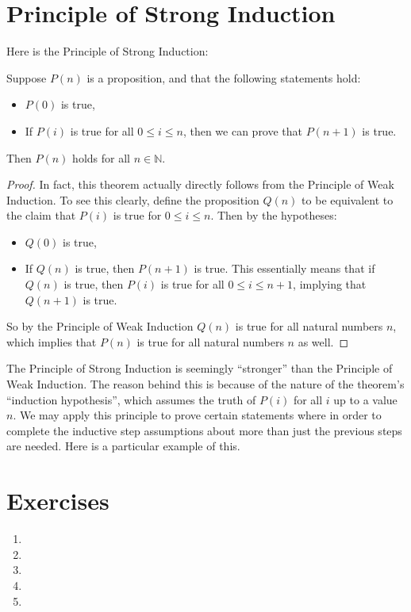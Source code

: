 \section{Principle of Strong Induction}

Here is the Principle of Strong Induction:

\begin{theorem}
Suppose $P(n)$ is a proposition, and that the following statements hold:
\begin{itemize}
    \item $P(0)$ is true,
    \item If $P(i)$ is true for all $0 \leq i \leq n$, then we can prove that $P(n + 1)$ is true.
\end{itemize}
Then $P(n)$ holds for all $n \in \mathbb{N}$.
\end{theorem}
\begin{proof}
In fact, this theorem actually directly follows from the Principle of Weak Induction. To see this clearly, define the proposition $Q(n)$ to be equivalent to the claim that $P(i)$ is true for $0 \leq i \leq n$. Then by the hypotheses:
\begin{itemize}
	\item $Q(0)$ is true,
	\item If $Q(n)$ is true, then $P(n + 1)$ is true. This essentially means that if $Q(n)$ is true, then $P(i)$ is true for all $0 \leq i \leq n + 1$, implying that $Q(n + 1)$ is true.
\end{itemize}

So by the Principle of Weak Induction $Q(n)$ is true for all natural numbers $n$, which implies that $P(n)$ is true for all natural numbers $n$ as well.
\end{proof}


The Principle of Strong Induction is seemingly ``stronger'' than the Principle of Weak Induction. The reason behind this is because of the nature of the theorem's ``induction hypothesis'', which assumes the truth of $P(i)$ for all $i$ up to a value $n$. We may apply this principle to prove certain statements where in order to complete the inductive step assumptions about more than just the previous steps are needed. Here is a particular example of this. 

\section{Exercises}
\begin{enumerate}
    \item 
    \item 
    \item 
    \item 
    \item 
\end{enumerate}